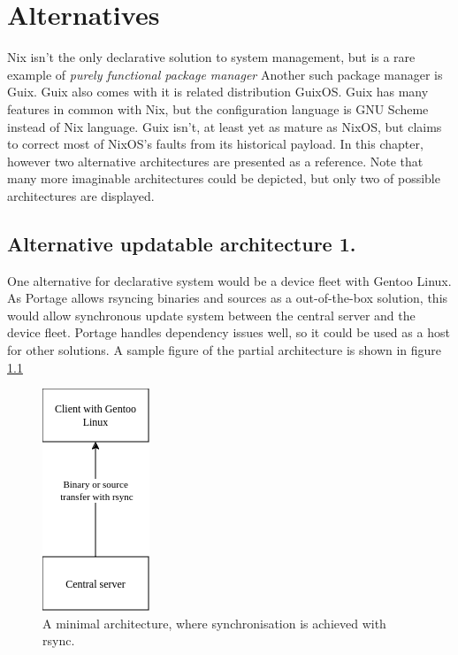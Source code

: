 \chapter{Alternatives} \label{alternatives}
Nix isn't the only declarative solution to system management, but is a
rare example of \textit{purely functional package manager} Another
such package manager is Guix. Guix also comes with it is related
distribution GuixOS. Guix has many features in common with Nix, but
the configuration language is GNU Scheme instead of Nix language. Guix
isn't, at least yet as mature as NixOS, but claims to correct most of
NixOS's faults from its historical payload. In this chapter, however
two alternative architectures are presented as a reference. Note that
many more imaginable architectures could be depicted, but only two of
possible architectures are displayed. \cite{dolstra2010nixos}
\cite{courtes2013functional}

\section{Alternative updatable architecture 1.}
One alternative for declarative system would be a device fleet with
Gentoo Linux. As Portage allows rsyncing binaries and sources as a
out-of-the-box solution, this would allow synchronous update system
between the central server and the device fleet. Portage handles
dependency issues well, so it could be used as a host for other
solutions. A sample figure of the partial architecture is shown in
figure \ref{gentooarchitecture} \cite{thiruvathukal2004gentoo}
\begin{figure}[H]
\centering
\includegraphics[scale=0.8]{latex/kuvat/gentooarchitecture.drawio.png}
\caption{A minimal architecture, where synchronisation is achieved
  with rsync.}
\label{gentooarchitecture}
\end{figure}

